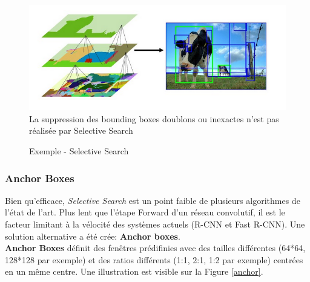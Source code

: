 \begin{figure}
    \centering
    \includegraphics[scale=0.4]{./tex/computer-vision/object-recognition/ssim2.png}
    La suppression des bounding boxes doublons ou inexactes n'est pas réalisée par Selective Search
    \caption{Exemple - Selective Search}
    \label{selese}
\end{figure}

\subsubsection{Anchor Boxes}

Bien qu'efficace, \textit{Selective Search} est un point faible de plusieurs algorithmes de l'état de l'art. Plus lent que l'étape Forward d'un réseau convolutif, il est le facteur limitant à la vélocité des systèmes actuels (R-CNN et Fast R-CNN). Une solution alternative a été crée: \textbf{Anchor boxes}.\\

\noindent \textbf{Anchor Boxes} définit des fenêtres prédifinies avec des tailles différentes (64*64, 128*128 par exemple) et des ratios différents (1:1, 2:1, 1:2 par exemple) centrées en un même centre. Une illustration est visible sur la Figure \ref{anchor}.\\

